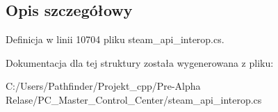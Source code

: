 \subsection{Opis szczegółowy}


Definicja w linii 10704 pliku steam\+\_\+api\+\_\+interop.\+cs.



Dokumentacja dla tej struktury została wygenerowana z pliku\+:\begin{DoxyCompactItemize}
\item 
C\+:/\+Users/\+Pathfinder/\+Projekt\+\_\+cpp/\+Pre-\/\+Alpha Relase/\+P\+C\+\_\+\+Master\+\_\+\+Control\+\_\+\+Center/steam\+\_\+api\+\_\+interop.\+cs\end{DoxyCompactItemize}
